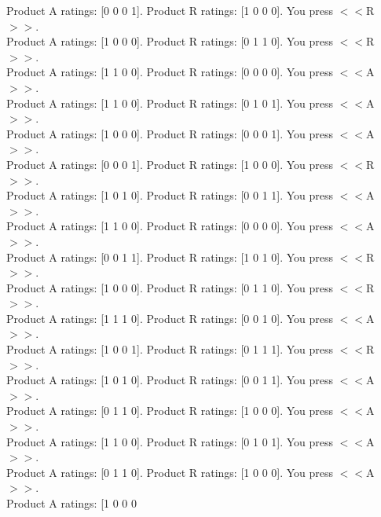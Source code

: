 \documentclass[pdflatex,sn-nature]{sn-jnl}%
\theoremstyle{thmstyleone}%
\theoremstyle{thmstyletwo}%
\theoremstyle{thmstylethree}%
\begin{document}
Product A ratings: [0 0 0 1]. Product R ratings: [1 0 0 0]. You press $<<$R$>>$. $~$\\ 
Product A ratings: [1 0 0 0]. Product R ratings: [0 1 1 0]. You press $<<$R$>>$. $~$\\ 
Product A ratings: [1 1 0 0]. Product R ratings: [0 0 0 0]. You press $<<$A$>>$. $~$\\ 
Product A ratings: [1 1 0 0]. Product R ratings: [0 1 0 1]. You press $<<$A$>>$. $~$\\ 
Product A ratings: [1 0 0 0]. Product R ratings: [0 0 0 1]. You press $<<$A$>>$. $~$\\ 
Product A ratings: [0 0 0 1]. Product R ratings: [1 0 0 0]. You press $<<$R$>>$. $~$\\ 
Product A ratings: [1 0 1 0]. Product R ratings: [0 0 1 1]. You press $<<$A$>>$. $~$\\ 
Product A ratings: [1 1 0 0]. Product R ratings: [0 0 0 0]. You press $<<$A$>>$. $~$\\ 
Product A ratings: [0 0 1 1]. Product R ratings: [1 0 1 0]. You press $<<$R$>>$. $~$\\ 
Product A ratings: [1 0 0 0]. Product R ratings: [0 1 1 0]. You press $<<$R$>>$. $~$\\ 
Product A ratings: [1 1 1 0]. Product R ratings: [0 0 1 0]. You press $<<$A$>>$. $~$\\ 
Product A ratings: [1 0 0 1]. Product R ratings: [0 1 1 1]. You press $<<$R$>>$. $~$\\ 
Product A ratings: [1 0 1 0]. Product R ratings: [0 0 1 1]. You press $<<$A$>>$. $~$\\ 
Product A ratings: [0 1 1 0]. Product R ratings: [1 0 0 0]. You press $<<$A$>>$. $~$\\ 
Product A ratings: [1 1 0 0]. Product R ratings: [0 1 0 1]. You press $<<$A$>>$. $~$\\ 
Product A ratings: [0 1 1 0]. Product R ratings: [1 0 0 0]. You press $<<$A$>>$. $~$\\ 
Product A ratings: [1 0 0 0 
\end{document}
